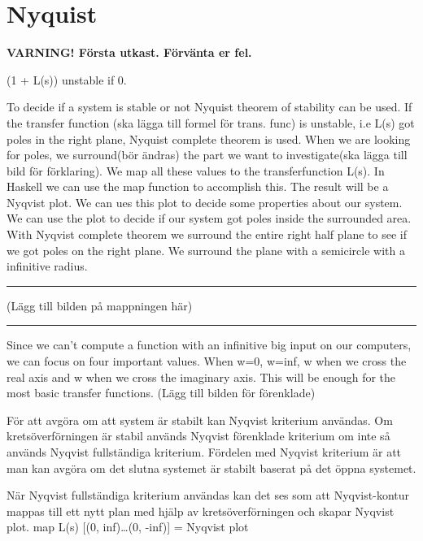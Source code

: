 \section{Nyquist}
\textbf{VARNING! Första utkast. Förvänta er fel.}

(1 + L(s)) unstable if 0.

To decide if a system is stable or not Nyquist theorem of stability can be used. If the transfer function (ska lägga till formel för trans. func) is unstable, i.e L(s) got poles in the right plane, Nyquist complete theorem is used. When we are looking for poles, we surround(bör ändras) the part we want to investigate(ska lägga till bild för förklaring). We map all these values to the transferfunction L(s). In Haskell we can use the map function to accomplish this. The result will be a Nyqvist plot. We can ues this plot to decide some properties about our system. We can use the plot to decide if our system got poles inside the surrounded area. With Nyqvist complete theorem we surround the entire right half plane to see if we got poles on the right plane. We surround the plane with a semicircle with a infinitive radius.
\hrule
(Lägg till bilden på mappningen här)
\hrule
Since we can’t compute a function with an infinitive big input on our computers, we can focus on four important values. When w=0, w=inf, w when we cross the real axis and w when we cross the imaginary axis. This will be enough for the most basic transfer functions. (Lägg till bilden för förenklade)


För att avgöra om att system är stabilt kan Nyqvist kriterium användas. Om kretsöverförningen är stabil används Nyqvist förenklade kriterium om inte så används Nyqvist fullständiga kriterium. Fördelen med Nyqvist kriterium är att man kan avgöra om det slutna systemet är stabilt baserat på det öppna systemet.

När Nyqvist fullständiga kriterium användas kan det ses som att Nyqvist-kontur mappas till ett nytt plan med hjälp av kretsöverförningen och skapar Nyqvist plot.
map L(s) [(0, inf)…(0, -inf)] = Nyqvist plot

